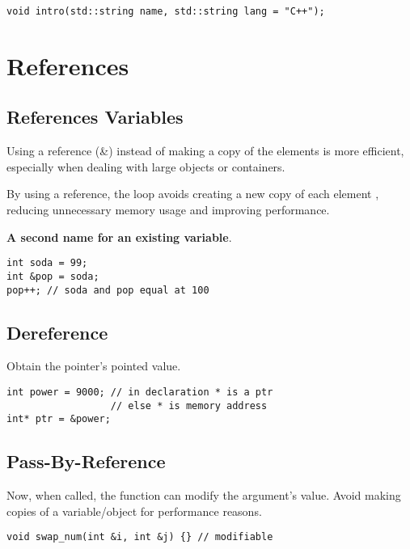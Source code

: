 \begin{verbatim}
void intro(std::string name, std::string lang = "C++");
\end{verbatim}

\section{References}

\subsection{References Variables}

Using a reference (\&) instead of making a copy of the elements is more efficient,
especially when dealing with large objects or containers. 

By using a reference, the loop avoids creating a new copy of each element
, reducing unnecessary memory usage and improving performance.

\textbf{A second name for an existing variable}.

\begin{verbatim}
int soda = 99;
int &pop = soda;
pop++; // soda and pop equal at 100
\end{verbatim}

\subsection{Dereference}

Obtain the pointer's pointed value. 

\begin{verbatim}
int power = 9000; // in declaration * is a ptr
                  // else * is memory address
int* ptr = &power;
\end{verbatim}

\subsection{Pass-By-Reference}

Now, when called, the function can modify the argument's value.
Avoid making copies of a variable/object for performance reasons.

\begin{verbatim}
void swap_num(int &i, int &j) {} // modifiable
\end{verbatim}

